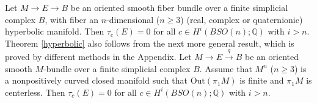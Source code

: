 \documentclass[onecolumn,notitlepage,11pt]{article}
\newcommand{\Q}{\mathbb{Q}}
\newenvironment{customthm}[1]
  {\renewcommand\theinnercustomthm{#1}\innercustomthm}
  {\endinnercustomthm}  %
\theoremstyle{definition}
\begin{document}
\begin{customthm}{E}\label{hyperbolic}
Let $M\to E\to B$ be an oriented smooth fiber 
bundle over a finite simplicial complex $B$, with fiber an
$n$-dimensional ($n\geq 3$) (real, complex or quaternionic) hyperbolic manifold.
Then $\tau_c(E)=0$ 
for all $c\in H^i(BSO(n);\Q)$ with $i>n$.
\end{customthm}
Theorem \ref{hyperbolic} also follows from the 
next more general result, which is proved by different 
methods in the Appendix.
\begin{customthm}{F}\label{app1}
Let $M\to E\xrightarrow{q} B$ be an oriented smooth $M$-bundle 
over a finite simplicial complex $B$. Assume that $M^n$ ($n\geq 3$)
is a nonpositively curved closed manifold such that
$\mbox{Out}(\pi_1M)$ is finite and $\pi_1M$ is centerless.
Then $\tau_c(E)=0$ for all $c\in H^i(BSO(n);\Q)$ with $i>n$.
\end{customthm}
\end{document}
